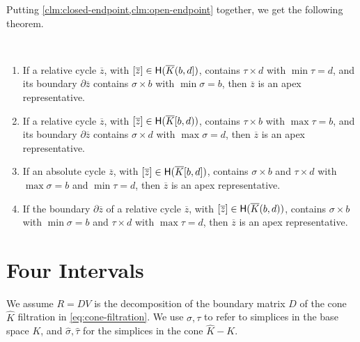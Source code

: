 \documentclass[cleveref,a4paper,english,nolineno]{socg-lipics-v2021}
\newcommand{\Hgr}{{\sf H}}
\newcommand{\prism}[1]{\overline{#1}}
\newcommand{\cone}[1]{\hat{#1}}
\newcommand{\bdry}{\partial}
\newcommand{\pK}{\prism{K}}
\newcommand{\cK}{\cone{K}}
\newcommand{\pz}{\prism{z}}
\newcommand{\ssx}{\sigma}
\newcommand{\tsx}{\tau}
\newcommand{\cssx}{\cone{\ssx}}
\newcommand{\ctsx}{\cone{\tsx}}
\begin{document}
Putting \cref{clm:closed-endpoint,clm:open-endpoint} together, we get the
following theorem.
\begin{theorem}~
    \label{thm:apex-representatives}

    \begin{enumerate}
        \item
            If a relative cycle $\pz$, with $[\pz] \in \Hgr(\pK(b,d])$, contains $\tsx \times d$ with $\min \tsx = d$,
            and its boundary $\bdry \pz$ contains $\ssx \times b$ with $\min \ssx = b$, then $\pz$ is an apex representative.
        \item
            If a relative cycle $\pz$, with $[\pz] \in \Hgr(\pK[b,d))$, contains $\tsx \times b$ with $\max \tsx = b$,
            and its boundary $\bdry \pz$ contains $\ssx \times d$ with $\max \ssx = d$, then $\pz$ is an apex representative.
        \item
            If an absolute cycle $\pz$, with $[\pz] \in \Hgr(\pK[b,d])$, contains $\ssx \times b$
            and $\tsx \times d$ with $\max \ssx = b$ and $\min \tsx = d$, then
            $\pz$ is an apex representative.
        \item
            If the boundary $\bdry \pz$ of a relative cycle $\pz$, with $[\pz] \in \Hgr(\pK(b,d))$,
            contains $\ssx \times b$ with $\min \ssx = b$ and $\tsx \times d$ with $\max \tsx = d$, then
            $\pz$ is an apex representative.
    \end{enumerate}
\end{theorem}


\section{Four Intervals}
\label{sec:intervals}


We assume $R=DV$ is the decomposition of the boundary matrix $D$ of the cone $\cK$
filtration in \cref{eq:cone-filtration}. We use $\ssx,\tsx$ to refer to
simplices in the base space $K$, and $\cssx,\ctsx$ for the simplices in the
cone $\cK - K$.
\end{document}
